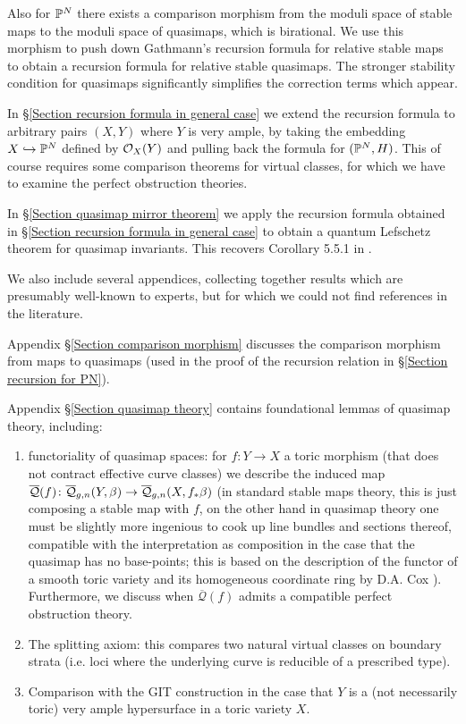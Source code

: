 Also for $\mathbb P^N$ there exists a comparison morphism from the moduli space of stable maps to the moduli space of quasimaps, which is birational. We use this morphism to push down Gathmann's recursion formula for relative stable maps to obtain a recursion formula for relative stable quasimaps. The stronger stability condition for quasimaps significantly simplifies the correction terms which appear.

In \S \ref{Section recursion formula in general case} we extend the recursion formula to arbitrary pairs $(X,Y)$ where $Y$ is very ample, by taking the embedding $X \hookrightarrow \mathbb P^N$ defined by $\mathcal{O}_X(Y)$ and pulling back the formula for $(\mathbb P^N,H)$. This of course requires some comparison theorems for virtual classes, for which we have to examine the perfect obstruction theories.

In \S \ref{Section quasimap mirror theorem} we apply the recursion formula obtained in \S \ref{Section recursion formula in general case} to obtain a quantum Lefschetz theorem for quasimap invariants. This recovers Corollary 5.5.1 in \cite{CF-K-wallcrossing}.

We also include several appendices, collecting together results which are presumably well-known to experts, but for which we could not find references in the literature.

Appendix \S \ref{Section comparison morphism} discusses the comparison morphism from maps to quasimaps (used in the proof of the recursion relation in \S \ref{Section recursion for PN}).

Appendix \S \ref{Section quasimap theory} contains foundational lemmas of quasimap theory, including:
\begin{enumerate}
\item functoriality of quasimap spaces: for $f\colon Y\to X$ a toric morphism (that does not contract effective curve classes) we describe the induced map $\overline{\mathcal{Q}}(f)\colon\overline{\mathcal Q}_{g,n}(Y,\beta)\rightarrow\overline{\mathcal Q}_{g,n}(X,f_*\beta)$ (in standard stable maps theory, this is just composing a stable map with $f$, on the other hand in quasimap theory one must be slightly more ingenious to cook up line bundles and sections thereof, compatible with the interpretation as composition in the case that the quasimap has no base-points; this is based on the description of the functor of a smooth toric variety and its homogeneous coordinate ring by D.A. Cox \cite{CoxFunctor}\cite{CoxRing}). Furthermore, we discuss when $\overline{\mathcal{Q}}(f)$ admits a compatible perfect obstruction theory.
\item The splitting axiom: this compares two natural virtual classes on boundary strata (i.e. loci where the underlying curve is reducible of a prescribed type).
\item Comparison with the GIT construction \cite{CFKM} in the case that $Y$ is a (not necessarily toric) very ample hypersurface in a toric variety $X$.
\end{enumerate}


